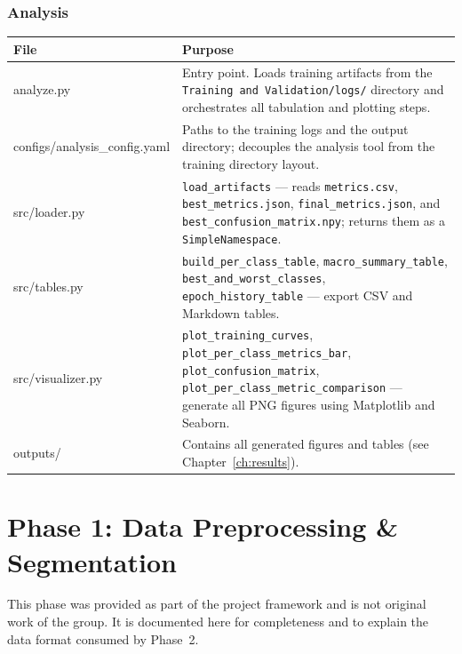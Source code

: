 \documentclass[12pt,a4paper]{report}
\begin{document}
\subsection{Analysis}

\begin{longtable}{>{\ttfamily\small}p{4.2cm} p{11cm}}
  \toprule
  \normalfont\textbf{File} & \textbf{Purpose} \\
  \midrule
  \endhead
  \bottomrule
  \endfoot
  analyze.py
    & Entry point. Loads training artifacts from the \texttt{Training and Validation/logs/} directory and orchestrates all tabulation and plotting steps. \\[4pt]
  configs/analysis\_config.yaml
    & Paths to the training logs and the output directory; decouples the analysis tool from the training directory layout. \\[4pt]
  src/loader.py
    & \texttt{load\_artifacts} — reads \texttt{metrics.csv}, \texttt{best\_metrics.json}, \texttt{final\_metrics.json}, and \texttt{best\_confusion\_matrix.npy}; returns them as a \texttt{SimpleNamespace}. \\[4pt]
  src/tables.py
    & \texttt{build\_per\_class\_table}, \texttt{macro\_summary\_table}, \texttt{best\_and\_worst\_classes}, \texttt{epoch\_history\_table} — export CSV and Markdown tables. \\[4pt]
  src/visualizer.py
    & \texttt{plot\_training\_curves}, \texttt{plot\_per\_class\_metrics\_bar}, \texttt{plot\_confusion\_matrix}, \texttt{plot\_per\_class\_metric\_comparison} — generate all PNG figures using Matplotlib and Seaborn. \\[4pt]
  outputs/
    & Contains all generated figures and tables (see Chapter~\ref{ch:results}). \\
\end{longtable}

\chapter{Phase 1: Data Preprocessing \& Segmentation}

\begin{notebox}[Attribution]
This phase was provided as part of the project framework and is not original work of the group. It is documented here for completeness and to explain the data format consumed by Phase~2.
\end{notebox}
\end{document}
